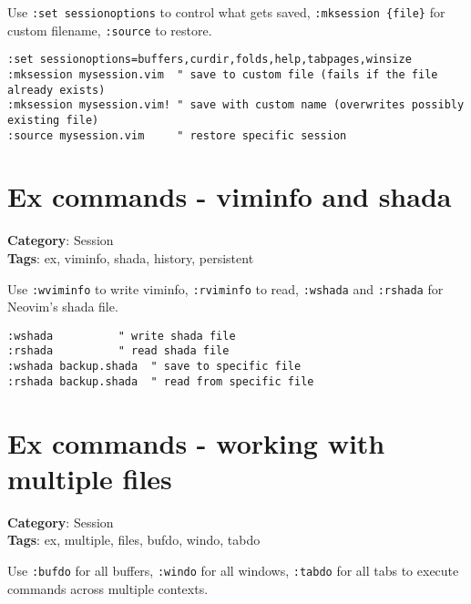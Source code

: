 {{{{{{{{{{{{{Use {\footnotesize \Verb§:set sessionoptions§} to control what gets saved, {\footnotesize \Verb§:mksession {file}§} for custom filename, {\footnotesize \Verb§:source§} to restore.

\begin{Exa*}{}
\begin{Verbatim}[fontsize=\footnotesize, breaklines, breakanywhere]
:set sessionoptions=buffers,curdir,folds,help,tabpages,winsize
:mksession mysession.vim  " save to custom file (fails if the file already exists)
:mksession mysession.vim! " save with custom name (overwrites possibly existing file)
:source mysession.vim     " restore specific session
\end{Verbatim}
\end{Exa*}

\section{Ex commands - viminfo and shada}

\textbf{Category}: Session\\ \textbf{Tags}: ex, viminfo, shada, history, persistent
\vspace{0.5cm}

Use {\footnotesize \Verb§:wviminfo§} to write viminfo, {\footnotesize \Verb§:rviminfo§} to read, {\footnotesize \Verb§:wshada§} and {\footnotesize \Verb§:rshada§} for Neovim's shada file.

\begin{Exa*}{}
\begin{Verbatim}[fontsize=\footnotesize, breaklines, breakanywhere]
:wshada          " write shada file
:rshada          " read shada file
:wshada backup.shada  " save to specific file
:rshada backup.shada  " read from specific file
\end{Verbatim}
\end{Exa*}

\section{Ex commands - working with multiple files}

\textbf{Category}: Session\\ \textbf{Tags}: ex, multiple, files, bufdo, windo, tabdo
\vspace{0.5cm}

Use {\footnotesize \Verb§:bufdo§} for all buffers, {\footnotesize \Verb§:windo§} for all windows, {\footnotesize \Verb§:tabdo§} for all tabs to execute commands across multiple contexts.

}}}}}}}}}}}}}

